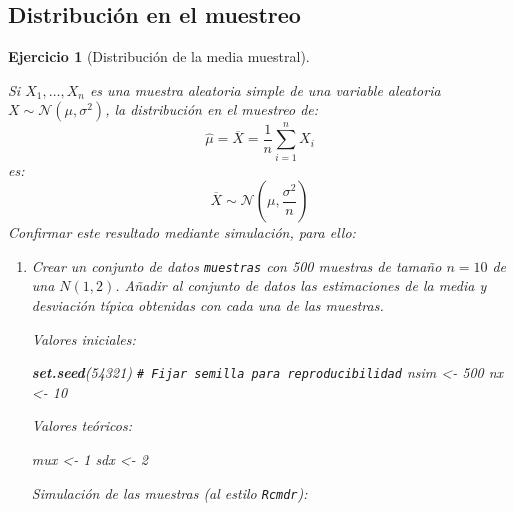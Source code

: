 \documentclass[
  spanish,
  10pt,
]{book}
\newenvironment{Shaded}{\begin{snugshade}}{\end{snugshade}}
\newcommand{\CommentTok}[1]{\textcolor[rgb]{0.56,0.35,0.01}{\textit{#1}}}
\newcommand{\DecValTok}[1]{\textcolor[rgb]{0.00,0.00,0.81}{#1}}
\newcommand{\FunctionTok}[1]{\textcolor[rgb]{0.13,0.29,0.53}{\textbf{#1}}}
\newcommand{\NormalTok}[1]{#1}
\newcommand{\OtherTok}[1]{\textcolor[rgb]{0.56,0.35,0.01}{#1}}
\theoremstyle{break}
\newtheorem{exercise}{Ejercicio}[chapter]
\theoremstyle{nonumberplain}
\renewcommand{\CommentTok}[1]{\textcolor[rgb]{0.41,0.41,0.41}{\texttt{#1}}}
\begin{document}
\subsection{Distribución en el muestreo}\label{distribuciuxf3n-en-el-muestreo}

\begin{exercise}[Distribución de la media muestral]
\protect\hypertarget{exr:distr-media}{}\label{exr:distr-media}

Si \(X_{1},\ldots,X_{n}\) es una muestra aleatoria simple de una
variable aleatoria \(X \sim \mathcal{N}\left( \mu, \sigma^2 \right)\), la
distribución en el muestreo de:
\[\hat{\mu}=\overline{X}=\dfrac{1}{n}\sum_{i=1}^{n}X_{i}\]
es:
\[\overline{X} \sim \mathcal{N}\left(  \mu,\dfrac{\sigma^2}{n}\right)\]
Confirmar este resultado mediante simulación, para ello:

\begin{enumerate}
\def\labelenumi{\alph{enumi})}
\item
  Crear un conjunto de datos \texttt{muestras} con 500 muestras de tamaño
  \(n=10\) de una \(N(1,2)\). Añadir al conjunto de datos las
  estimaciones de la media y desviación típica obtenidas con cada
  una de las muestras.

  Valores iniciales:

\begin{Shaded}
\begin{Highlighting}[]
\FunctionTok{set.seed}\NormalTok{(}\DecValTok{54321}\NormalTok{) }\CommentTok{\# Fijar semilla para reproducibilidad}
\NormalTok{nsim }\OtherTok{\textless{}{-}} \DecValTok{500}
\NormalTok{nx }\OtherTok{\textless{}{-}} \DecValTok{10}
\end{Highlighting}
\end{Shaded}

  Valores teóricos:

\begin{Shaded}
\begin{Highlighting}[]
\NormalTok{mux }\OtherTok{\textless{}{-}} \DecValTok{1}
\NormalTok{sdx }\OtherTok{\textless{}{-}} \DecValTok{2}
\end{Highlighting}
\end{Shaded}

  Simulación de las muestras (al estilo \texttt{Rcmdr}):


\end{enumerate}
\end{exercise}
\end{document}
